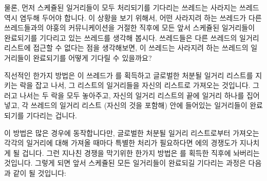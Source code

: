 {	물론, 먼저 스케쥴된 일거리들이 모두 처리되기를 기다리는 쓰레드는
	사라지는 쓰레드 역시 염두해 두어야 합니다.
	이 상황을 보기 위해서, 어떤 사라지려 하는 쓰레드가 다른 쓰레드들과의
	야훙의 커뮤니케이션을 거절한 직후에 모든 앞서 스케쥴된 일거리들이
	완료되기를 기다리고 있는 쓰레드를 생각해 봅시다.
	쓰레드들은 다른 쓰레드의 일거리 리스트에 접근할 수 없다는 점을
	생각해보면, 이 쓰레드는 사라지려 하는 쓰레드의 일거리들이 완료되기를
	어떻게 기다릴 수 있을까요?

	직선적인 한가지 방법은 이 쓰레드가  를 획득하고 글로벌한 처분될
	일거리 리스트를 지키는 락을 잡고 나서, 그 리스트의 일거리들을 자신의
	리스트로 가져오는 것입니다.
	그러고 나서는 두 락을 모두 놓아주고, 자신의 일거리 리스트의 끝에 일거리
	하나를 집어넣고, 각 쓰레드의 일거리 리스트 (자신의 것을 포함해) 안에
	들어있는 일거리들이 완료되기를 기다리는 겁니다.

	이 방법은 많은 경우에 동작합니다만, 글로벌한 처분될 일거리 리스트로부터
	가져오는 각각의 일거리에 대해 가져올 때마다 특별한 처리가 필요하다면
	 에의 경쟁도가 지나치게 될 겁니다.
	그런 지나친 경쟁을 막기위한 한가지 방법은  를 획득한 직후에
	놔버리는 것입니다.
	그렇게 되면 앞서 스케쥴된 모든 일거리들이 완료되길 기다리는 과정은
	다음과 같이 될 것입니다:

}
